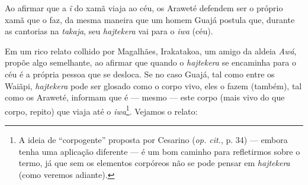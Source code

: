 Ao afirmar que a \emph{ĩ} do xamã viaja ao céu, os Araweté defendem ser
o próprio xamã que o faz, da mesma maneira que um homem Guajá postula
que, durante as cantorias na \emph{takaja}, seu \emph{hajtekera} vai
para o \emph{iwa} (céu).

Em um rico relato colhido por Magalhães, Irakatakoa, um amigo da aldeia
\emph{Awá}, propõe algo semelhante, ao afirmar que quando o
\emph{hajtekera} se encaminha para o céu é a própria pessoa que se
desloca. Se no caso Guajá, tal como entre os Waiãpi, \emph{hajtekera}
pode ser glosado como o corpo vivo, eles o fazem (também), tal como os
Araweté, informam que é --- mesmo --- este corpo (mais vivo do que corpo,
repito) que viaja até o \emph{iwa}\footnote{A ideia de ``corpogente''
  proposta por Cesarino (\emph{op. cit.}, p. 34) --- embora tenha uma aplicação
  diferente --- é um bom caminho para refletirmos sobre o termo, já que
  sem os elementos corpóreos não se pode pensar em \emph{hajtekera}
  (como veremos adiante).}. Vejamos o relato:

